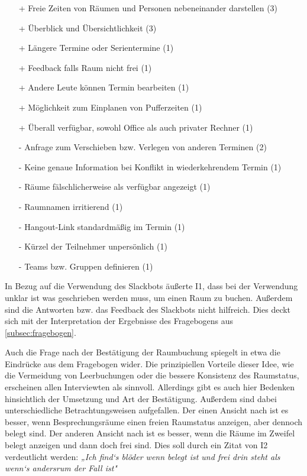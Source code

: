 \begin{itemize}
    \item[+] Freie Zeiten von Räumen und Personen nebeneinander darstellen (3)
    \item[+] Überblick und Übersichtlichkeit (3)
    \item[+] Längere Termine oder Serientermine (1)
    \item[+] Feedback falls Raum nicht frei (1)
    \item[+] Andere Leute können Termin bearbeiten (1)
    \item[+] Möglichkeit zum Einplanen von Pufferzeiten (1)
    \item[+] Überall verfügbar, sowohl Office als auch privater Rechner (1)
    \item[-] Anfrage zum Verschieben bzw. Verlegen von anderen Terminen (2)
    \item[-] Keine genaue Information bei Konflikt in wiederkehrendem Termin (1)
    \item[-] Räume fälschlicherweise als verfügbar angezeigt (1)
    \item[-] Raumnamen irritierend (1)
    \item[-] Hangout-Link standardmäßig im Termin (1)
    \item[-] Kürzel der Teilnehmer unpersönlich (1)
    \item[-] Teams bzw. Gruppen definieren (1)
\end{itemize}

In Bezug auf die Verwendung des Slackbots äußerte I1, dass bei der Verwendung unklar ist was geschrieben werden muss, um einen Raum zu buchen. Außerdem sind die Antworten bzw. das Feedback des Slackbots nicht hilfreich. Dies deckt sich mit der Interpretation der Ergebnisse des Fragebogens aus \ref{subsec:fragebogen}. 

Auch die Frage nach der Bestätigung der Raumbuchung spiegelt in etwa die Eindrücke aus dem Fragebogen wider. Die prinzipiellen Vorteile dieser Idee, wie die Vermeidung von Leerbuchungen oder die bessere Konsistenz des Raumstatus, erscheinen allen Interviewten als sinnvoll. Allerdings gibt es auch hier Bedenken hinsichtlich der Umsetzung und Art der Bestätigung. Außerdem sind dabei unterschiedliche Betrachtungsweisen aufgefallen. Der einen Ansicht nach ist es besser, wenn Besprechungsräume einen freien Raumstatus anzeigen, aber dennoch belegt sind. Der anderen Ansicht nach ist es besser, wenn die Räume im Zweifel belegt anzeigen und dann doch frei sind. Dies soll durch ein Zitat von I2 verdeutlicht werden: \textit{„Ich find‘s blöder wenn belegt ist und frei drin steht als wenn‘s andersrum der Fall ist"}

